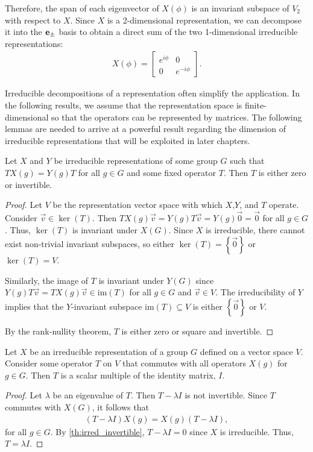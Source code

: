 \begin{example}
    Therefore, the span of each eigenvector of $X(\phi)$ is an invariant subspace of $V_2$ with respect to $X$. Since $X$ is a 2-dimensional representation, we can decompose it into the $\mathbf{e}_\pm$ basis to obtain a direct sum of the two 1-dimensional irreducible representations:
    \begin{align}
        X(\phi) = \begin{bmatrix}
            e^{i\phi} & 0\\
            0 & e^{-i\phi}
        \end{bmatrix}.
    \end{align}
\end{example}

Irreducible decompositions of a representation often simplify the application. In the following results, we assume that the representation space is finite-dimensional so that the operators can be represented by matrices. The following lemmas are needed to arrive at a powerful result regarding the dimension of irreducible representations that will be exploited in later chapters.

\begin{lemma}\label{th:irred_invertible}
    Let $X$ and $Y$ be irreducible representations of some group $G$ such that $TX(g)=Y(g)T$ for all $g\in G$ and some fixed operator $T$. Then $T$ is either zero or invertible.
\end{lemma}
\begin{proof}
    Let $V$ be the representation vector space with which $X$,$Y$, and $T$ operate. Consider $\vec{v}\in\ker(T)$. Then $TX(g)\vec{v} = Y(g)T\vec{v} = Y(g)\vec{0}=\vec{0}$ for all $g\in G$. Thus, $\ker(T)$ is invariant under $X(G)$. Since $X$ is irreducible, there cannot exist non-trivial invariant subspaces, so either $\ker(T) = \left\{ \vec{0} \right\}$ or $\ker(T) = V$.

    Similarly, the image of $T$ is invariant under $Y(G)$ since $Y(g)T\vec{v} = TX(g)\vec{v}\in\textrm{im}(T)$ for all $g\in G$ and $\vec{v}\in V$. The irreducibility of $Y$ implies that the $Y$-invariant subspace $\textrm{im}(T)\subseteq V$ is either $\left\{ \vec{0} \right\}$ or $V$.

    By the rank-nullity theorem, $T$ is either zero or square and invertible.
\end{proof}

\begin{lemma}\label{th:schur}
    Let $X$ be an irreducible representation of a group $G$ defined on a vector space $V$. Consider some operator $T$ on $V$ that commutes with all operators $X(g)$ for $g\in G$. Then $T$ is a scalar multiple of the identity matrix, $I$.
\end{lemma}
\begin{proof}
    Let $\lambda$ be an eigenvalue of $T$. Then $T-\lambda I$ is not invertible. Since $T$ commutes with $X(G)$, it follows that
    \begin{align}
        (T-\lambda I)X(g)=X(g)(T-\lambda I),
    \end{align}
    for all $g\in G$. By \cref{th:irred_invertible}, $T-\lambda I = 0$ since $X$ is irreducible. Thus, $T=\lambda I$.
\end{proof}

